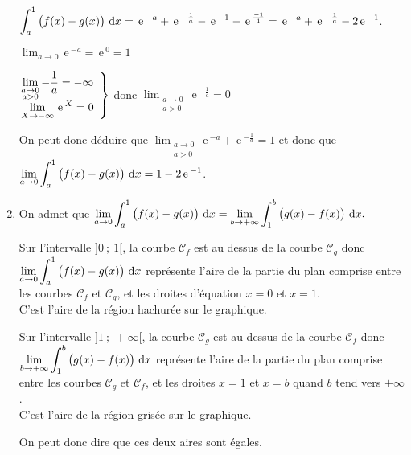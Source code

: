 \documentclass[10pt,a4paper]{article}
\renewcommand{\d}{\mathrm{\,d}}%
\newcommand{\e}{\mathrm{\,e\,}}%
\newcommand{\ds}{\displaystyle}
\begin{document}
\begin{enumerate}
$\ds\int_{a}^{1} \left ( f(x)-g(x)\strut\right ) \d x  = \e^{-a} + \e^{-\frac{1}{a}} - \e^{-1} -\e^{\frac{-1}{1}}
= \e^{-a} + \e^{-\frac{1}{a}} - 2\e^{-1}$.

$\ds\lim_{a\to 0} \e^{-a} = \e^{0}=1$

$\left .
\begin{array}{@{}l}
\ds\lim_{\substack{a\to 0\\a>0}} -\dfrac{1}{a} = -\infty\\[7pt]
\ds\lim_{X\to -\infty} \e^{X} = 0\\
\end{array}
\right \rbrace$ donc
$\ds\lim_{\substack{a\to 0\\a>0}} \e^{-\frac{1}{a}} = 0$

On peut donc déduire que 
$\ds\lim_{\substack{a\to 0\\a>0}}  \e^{-a} + \e^{-\frac{1}{a}} = 1$
et donc que
$\ds\lim_{a\to 0} \ds\int_{a}^{1} \left ( f(x)-g(x)\strut\right ) \d x =1-2\e^{-1}$.

\item On admet que
$\ds\lim_{a\to 0} \ds\int_{a}^{1} \left ( f(x)-g(x)\strut\right ) \d x =\ds\lim_{b\to +\infty} \ds\int_{1}^{b} \left ( g(x)-f(x)\strut\right ) \d x .$


Sur l'intervalle $]0~;~1[$, la courbe $\mathcal{C}_f$ est au dessus de la courbe $\mathcal{C}_g$ donc\\
$\ds\lim_{a\to 0} \ds\int_{a}^{1} \left ( f(x)-g(x)\strut\right ) \d x$ représente l'aire de la partie du plan comprise entre les courbes $\mathcal{C}_f$ et $\mathcal{C}_g$, et les droites d'équation $x=0$ et $x=1$. \\
C'est l'aire de la région hachurée sur le graphique.

Sur l'intervalle $]1~;~+\infty[$, la courbe $\mathcal{C}_g$ est au dessus de la courbe $\mathcal{C}_f$ donc\\
$\ds\lim_{b\to +\infty} \ds\int_{1}^{b} \left ( g(x)-f(x)\strut\right ) \d x $ représente l'aire de la partie du plan comprise entre les courbes $\mathcal{C}_g$ et $\mathcal{C}_f$, et les droites $x=1$ et $x=b$ quand $b$ tend vers $+\infty$. \\
C'est l'aire de la région grisée sur le graphique.

On peut donc dire que ces deux aires sont égales. 
 
\end{enumerate}

\vspace{0,5cm}
\end{document}
